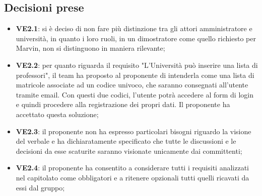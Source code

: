 	\subsection{Decisioni prese}
		\begin{itemize}
			\item \textbf{VE2.1}: si è deciso di non fare più distinzione tra gli attori amministratore e università, in quanto i loro ruoli, in un dimostratore come quello richiesto per Marvin, non si distinguono in maniera rilevante;
			\item \textbf{VE2.2}: per quanto riguarda il requisito "L'Università può inserire una lista di professori", il team ha proposto al proponente di intenderla come una lista di matricole associate ad un codice univoco, che saranno consegnati all'utente tramite email. Con questi due codici, l'utente potrà accedere al form di login e quindi procedere alla registrazione dei propri dati. Il proponente ha accettato questa soluzione;
			\item \textbf{VE2.3}: il proponente non ha espresso particolari bisogni riguardo la visione del verbale e ha dichiaratamente specificato che tutte le discussioni e le decisioni da esse scaturite saranno visionate unicamente dai committenti;
			\item \textbf{VE2.4}: il proponente ha consentito a considerare tutti i requisiti analizzati nel capitolato come obbligatori e a ritenere opzionali tutti quelli ricavati da essi dal gruppo;
		\end{itemize}